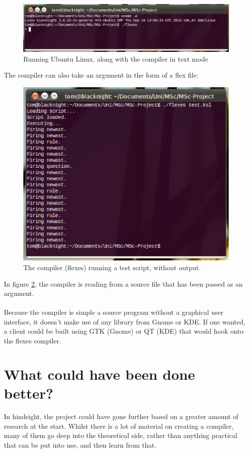 \documentclass[12pt]{report}
\begin{document}
\begin{figure}[H]
	\centering
	\includegraphics[scale=0.75]{linux}
	\caption{Running Ubuntu Linux, along with the compiler in text mode}\label{fig:linux}
\end{figure}
The compiler can also take an argument in the form of a flex file:
\begin{figure}[H]
	\centering
	\includegraphics[scale=0.75]{flexes}
	\caption{The compiler (flexes) running a test script, without output.}\label{fig:flexes}
\end{figure}
In figure \ref{fig:flexes}, the compiler is reading from a source file that has been passed as an argument.\\
\\
Because the compiler is simple a source program without a graphical user interface, it doesn't make use of any library from Gnome or KDE.  If one wanted, a client could be built using GTK (Gnome) or QT (KDE) that would hook onto the flexes compiler.
\section{What could have been done better?}\label{sec:con:better}
In hindsight, the project could have gone further based on a greater amount of research at the start.  Whilst there is a lot of material on creating a compiler, many of them go deep into the theoretical side, rather than anything practical that can be put into use, and then learn from that.




\end{document}
